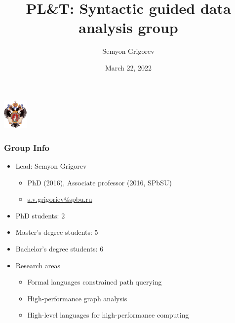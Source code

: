 \documentclass[xcolor=table,aspectratio=169]{beamer}
\title[Syntactic guided data analysis group]{PL\&T: Syntactic guided data analysis group}
\institute[PL\&T@SPbSU]{
Saint Petersburg State University
}
\author[Semyon Grigorev]{Semyon Grigorev}
\date{March 22, 2022}
\begin{document}
{
\begin{frame}[fragile]
  \begin{table}
  \centering
  \includegraphics[height=1.5cm]{pictures/SPbGU_Logo.png}
  \end{table}
  \titlepage
\end{frame}
}



\begin{frame}[fragile]
  \frametitle{Group Info}  
  \begin{itemize}
      \item Lead: Semyon Grigorev
      \begin{itemize}
        \item PhD (2016), Associate professor (2016, SPbSU)
        \item \href{s.v.grigoriev@spbu.ru}{s.v.grigoriev@spbu.ru}
      \end{itemize}
      \item PhD students: 2
      \item Master's degree students: 5
      \item Bachelor's degree students: 6
      \item Research areas
      \begin{itemize}
        \item Formal languages constrained path querying
        \item High-performance graph analysis
        \item High-level languages for high-performance computing
      \end{itemize}
    \end{itemize}
\end{frame}
\end{document}
